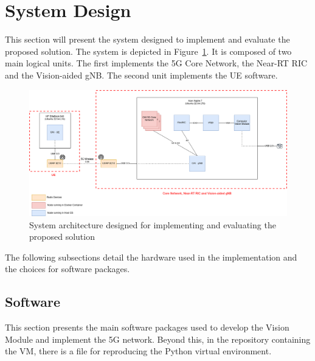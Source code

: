 \section{System Design}\label{sec:design}

This section will present the system designed to implement and evaluate the proposed solution.
The system is depicted in Figure~\ref{fig:design_arch}.
It is composed of two main logical units.
The first implements the 5G Core Network, the Near-RT RIC and the Vision-aided gNB\@.
The second unit implements the UE software.


\begin{figure}
    \centering
    \includegraphics[width=0.7\linewidth]{figures/System Arch.drawio}
    \caption[System architecture designed for implementing and evaluating the proposed solution]{System architecture designed for implementing and evaluating the proposed solution}
    \label{fig:design_arch}
\end{figure}

The following subsections detail the hardware used in the implementation and the choices for software packages.


\subsection{Software}
This section presents the main software packages used to develop the Vision Module and implement the 5G network.
Beyond this, in the repository containing the VM, there is a file for reproducing the Python virtual environment.

